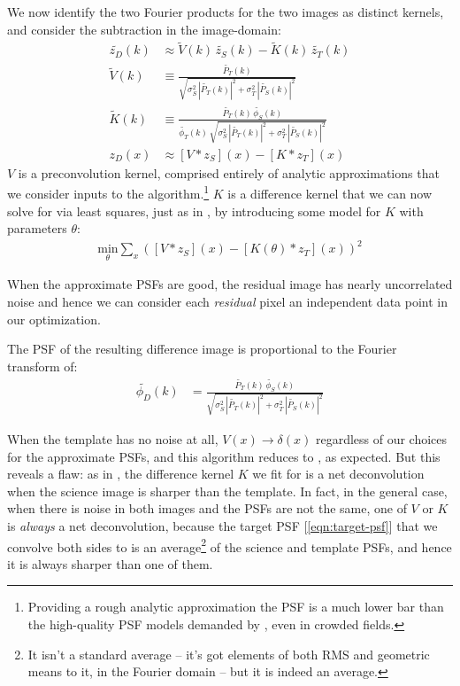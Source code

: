 \documentclass[DM,authoryear,toc]{lsstdoc}
\newcommand{\ZOGY}{\citetalias{2016ApJ...830...27Z}}
\newcommand{\AL}{\citetalias{1998ApJ...503..325A}}
\begin{document}
We now identify the two Fourier products for the two images as distinct kernels, and consider the subtraction in the image-domain:
\begin{align}
  \widetilde{z_D}(k) & \approx \widetilde{V}(k) \, \widetilde{z_S}(k)
    - \widetilde{K}(k) \, \widetilde{z_T}(k) \\
  \widetilde{V}(k) & \equiv \frac{
    \widetilde{P_T}(k)
  }{
    \sqrt{
      \sigma_S^2 \, \left|\widetilde{P_T}(k)\right|^2
      + \sigma_T^2 \, \left|\widetilde{P_S}(k)\right|^2
    }
  } \label{eqn:preconvolution-kernel} \\
  \widetilde{K}(k) & \equiv \frac{
      \widetilde{P_T}(k) \, \widetilde{\phi_S}(k)
  }{
    \widetilde{\phi_T}(k) \,
    \sqrt{
      \sigma_S^2 \, \left|\widetilde{P_T}(k)\right|^2
      + \sigma_T^2 \, \left|\widetilde{P_S}(k)\right|^2
    }
  } \\
  z_D(x) & \approx \left[V \ast z_S\right](x) - \left[K \ast z_T\right](x)
\end{align}
$V$ is a preconvolution kernel, comprised entirely of analytic approximations that we consider inputs to the algorithm.\footnote{Providing a rough analytic approximation the PSF is a much lower bar than the high-quality PSF models demanded by \ZOGY{}, even in crowded fields.}
$K$ is a difference kernel that we can now solve for via least squares, just as in \AL{}, by introducing some model for $K$ with parameters $\theta$:
\begin{align}
  \underset{\theta}{\text{min}} \sum_x \left(
      \left[V \ast z_S\right](x) - \left[K(\theta) \ast z_T\right](x)
    \right)^2
  \label{eqn:least-squares}
\end{align}

When the approximate PSFs are good, the residual image has nearly uncorrelated noise and hence we can consider each \emph{residual} pixel an independent data point in our optimization.

The PSF of the resulting difference image is proportional to the Fourier transform of:
\begin{align}
  \widetilde{\phi_D}(k) &= \frac{
      \widetilde{P_T}(k) \, \widetilde{\phi_S}(k)
    }{
      \sqrt{
          \sigma_S^2 \, \left|\widetilde{P_T}(k)\right|^2
          + \sigma_T^2 \, \left|\widetilde{P_S}(k)\right|^2
      }
    }\label{eqn:target-psf}
\end{align}

When the template has no noise at all, $V(x) \rightarrow \delta(x)$ regardless of our choices for the approximate PSFs, and this algorithm reduces to \AL{}, as expected.
But this reveals a flaw: as in \AL{}, the difference kernel $K$ we fit for is a net deconvolution when the science image is sharper than the template.
In fact, in the general case, when there is noise in both images and the PSFs are not the same, one of $V$ or $K$ is \emph{always} a net deconvolution, because the target PSF [\ref{eqn:target-psf}] that we convolve both sides to is an average\footnote{It isn't a standard average -- it's got elements of both RMS and geometric means to it, in the Fourier domain -- but it is indeed an average.} of the science and template PSFs, and hence it is always sharper than one of them.
\end{document}
